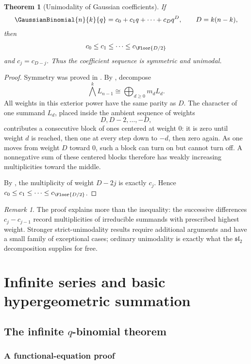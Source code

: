 \documentclass[11pt,a4paper,oneside,openany]{book}
\newtheorem{theorem}{Theorem}[chapter]
\theoremstyle{definition}
\theoremstyle{remark}
\newtheorem{remark}[remark]{Remark}
\begin{document}
\begin{theorem}[Unimodality of Gaussian coefficients]\label{thm:qbinom-unimodal}
If
\[
 \GaussianBinomial{n}{k}{q}=c_0+c_1q+\cdots+c_Dq^D,
 \qquad D=k(n-k),
\]
then
\[
 c_0\le c_1\le\cdots\le c_{\Floor{D/2}}
\]
and $c_j=c_{D-j}$.  Thus the coefficient sequence is symmetric and unimodal.
\end{theorem}

\begin{proof}
Symmetry was proved in .  By , decompose
\[
 \bigwedge^kL_{n-1}\cong\bigoplus_{d\ge0}m_dL_d.
\]
All weights in this exterior power have the same parity as $D$.  The character of one summand $L_d$, placed inside the ambient sequence of weights
\[
 D,D-2,\dots,-D,
\]
contributes a consecutive block of ones centered at weight $0$: it is zero until weight $d$ is reached, then one at every step down to $-d$, then zero again.  As one moves from weight $D$ toward $0$, such a block can turn on but cannot turn off.  A nonnegative sum of these centered blocks therefore has weakly increasing multiplicities toward the middle.

By , the multiplicity of weight $D-2j$ is exactly $c_j$.  Hence $c_0\le c_1\le\cdots\le c_{\Floor{D/2}}$.
\end{proof}

\begin{remark}
The proof explains more than the inequality: the successive differences $c_j-c_{j-1}$ record multiplicities of irreducible summands with prescribed highest weight.  Stronger strict-unimodality results require additional arguments and have a small family of exceptional cases; ordinary unimodality is exactly what the $\mathfrak{sl}_2$ decomposition supplies for free.
\end{remark}


\part{Infinite series and basic hypergeometric summation}

\chapter{The infinite \texorpdfstring{$q$}{q}-binomial theorem}\label{chap:infinite-qbinomial}

\section{A functional-equation proof}
\end{document}
